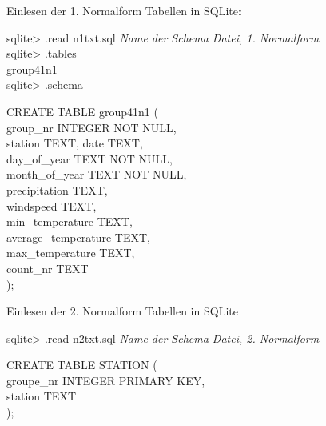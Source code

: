 \documentclass{article}
\begin{document}
Einlesen der 1. Normalform Tabellen in SQLite: \\ \indent

sqlite> .read n1txt.sql \hspace{1.5cm}\textit{Name der Schema Datei, 1. Normalform} \\ \indent 
sqlite> .tables \\ \indent
group41n1 \\ \indent
sqlite> .schema \\ \indent

CREATE TABLE group41n1 (  \\ \indent
\hspace{1cm} group\_nr INTEGER NOT NULL, \\ \indent
\hspace{1cm} station TEXT, date TEXT, \\ \indent
\hspace{1cm} day\_of\_year TEXT NOT NULL, \\ \indent
\hspace{1cm} month\_of\_year TEXT NOT NULL, \\ \indent
\hspace{1cm} precipitation TEXT, \\ \indent
\hspace{1cm} windspeed TEXT, \\ \indent
\hspace{1cm} min\_temperature TEXT, \\ \indent
\hspace{1cm} average\_temperature TEXT, \\ \indent
\hspace{1cm} max\_temperature TEXT, \\ \indent
\hspace{1cm} count\_nr TEXT \\ \indent
); \\ \indent

Einlesen der 2. Normalform Tabellen in SQLite \\ \indent

sqlite> .read n2txt.sql \hspace{1.5cm}\textit{Name der Schema Datei, 2. Normalform } \\ \indent 

CREATE TABLE STATION ( \\ \indent
\hspace{1cm}groupe\_nr INTEGER PRIMARY KEY, \\ \indent
\hspace{1cm}station TEXT \\ \indent
);\\ \indent
\end{document}
